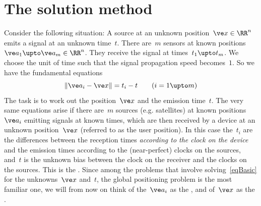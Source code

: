 \documentclass[reqno]{amsart}
\begin{document}
\section{The solution method}
\label{sSolution}

Consider the following situation: A source at an unknown
position~$\ve x \in \RR^n$ emits a signal at an unknown time~$t$.
There are~$m$ sensors at known positions
$\ve a_1 \upto \ve a_m \in \RR^n$. They receive the signal at
times~$t_1 \upto t_m$. We choose the unit of time such that the signal
propagation speed becomes~$1$. So we have the fundamental equations
\begin{equation} \label{eqBasic}%
  \lVert\ve a_i - \ve x\rVert = t_i - t \qquad (i = 1 \upto m)
\end{equation}
The task is to work out the position~$\ve x$ and the emission
time~$t$. The very same equations arise if there are~$m$ sources
(e.g. satellites) at known positions~$\ve a_i$ emitting signals at
known times, which are then received by a device at an unknown
position~$\ve x$ (referred to as the user position). In
this case the~$t_i$ are the differences between the reception times
{\em according to the clock on the device} and the emission times
according to the (near-perfect) clocks on the sources, and~$t$ is the
unknown bias between the clock on the receiver and the clocks on the
sources. This is the . Since among the problems that involve solving~\eqref{eqBasic} for the unknowns~$\ve x$ and~$t$, the global positioning problem is the most familiar one, we will from now on think of the~$\ve a_i$ as the , and of~$\ve x$ as the .
\end{document}
